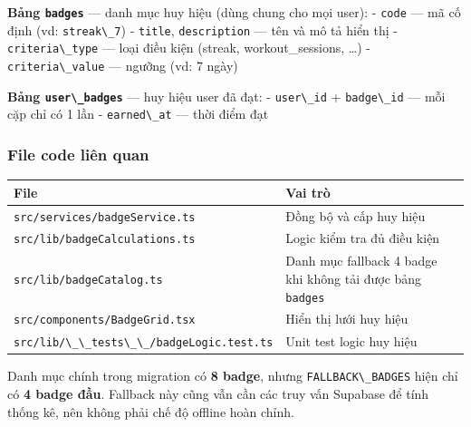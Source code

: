 \documentclass[12pt,a4paper]{article}
\newcounter{none}
\providecommand{\passthrough}[1]{#1}
\begin{document}
\textbf{Bảng \passthrough{\lstinline!badges!}} --- danh mục huy hiệu
(dùng chung cho mọi user): - \passthrough{\lstinline!code!} --- mã cố
định (vd: \passthrough{\lstinline!streak\_7!}) -
\passthrough{\lstinline!title!}, \passthrough{\lstinline!description!}
--- tên và mô tả hiển thị - \passthrough{\lstinline!criteria\_type!} ---
loại điều kiện (streak, workout\_sessions, \ldots) -
\passthrough{\lstinline!criteria\_value!} --- ngưỡng (vd: 7 ngày)

\textbf{Bảng \passthrough{\lstinline!user\_badges!}} --- huy hiệu user
đã đạt: - \passthrough{\lstinline!user\_id!} +
\passthrough{\lstinline!badge\_id!} --- mỗi cặp chỉ có 1 lần -
\passthrough{\lstinline!earned\_at!} --- thời điểm đạt

\subsubsection{File code liên quan}\label{file-code-liuxean-quan-1}

{\def\LTcaptype{none} %
\begin{longtable}[]{@{}
  >{\raggedright\arraybackslash}p{}
  >{\raggedright\arraybackslash}p{}@{}}
\toprule\noalign{}
\begin{minipage}[b]{\linewidth}\raggedright
File
\end{minipage} & \begin{minipage}[b]{\linewidth}\raggedright
Vai trò
\end{minipage} \\
\midrule\noalign{}
\endhead
\bottomrule\noalign{}
\endlastfoot
\passthrough{\lstinline!src/services/badgeService.ts!} & Đồng bộ và cấp
huy hiệu \\
\passthrough{\lstinline!src/lib/badgeCalculations.ts!} & Logic kiểm tra
đủ điều kiện \\
\passthrough{\lstinline!src/lib/badgeCatalog.ts!} & Danh mục fallback 4
badge khi không tải được bảng \passthrough{\lstinline!badges!} \\
\passthrough{\lstinline!src/components/BadgeGrid.tsx!} & Hiển thị lưới
huy hiệu \\
\passthrough{\lstinline!src/lib/\_\_tests\_\_/badgeLogic.test.ts!} &
Unit test logic huy hiệu \\
\end{longtable}
}

Danh mục chính trong migration có \textbf{8 badge}, nhưng
\passthrough{\lstinline!FALLBACK\_BADGES!} hiện chỉ có \textbf{4 badge
đầu}. Fallback này cũng vẫn cần các truy vấn Supabase để tính thống kê,
nên không phải chế độ offline hoàn chỉnh.
\end{document}

